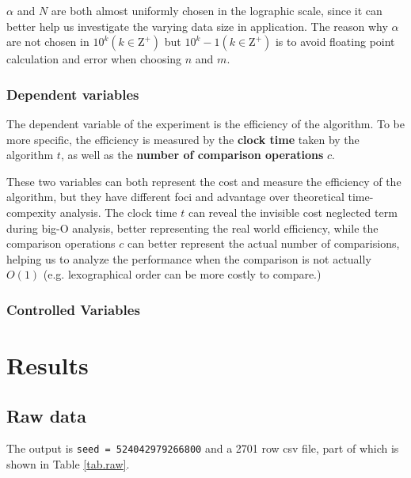 \documentclass[12pt]{article}
\begin{document}
$\alpha$ and $N$ are both almost uniformly chosen in the lographic scale, since it can better help us investigate the varying data size in application. The reason why $\alpha$ are not chosen in $10^k (k\in\mathrm{Z}^+)$ but $10^k-1 (k\in\mathrm{Z}^+)$ is to avoid floating point calculation and error when choosing $n$ and $m$.

\subsubsection{Dependent variables}

The dependent variable of the experiment is the efficiency of the algorithm. To be more specific, the efficiency is measured by the \textbf{clock time} taken by the algorithm $t$, as well as the \textbf{number of comparison operations} $c$.

These two variables can both represent the cost and measure the efficiency of the algorithm, but they have different foci and advantage over theoretical time-compexity analysis. The clock time $t$ can reveal the invisible cost neglected term during big-O analysis, better representing the real world efficiency, while the comparison operations $c$ can better represent the actual number of comparisions, helping us to analyze the performance when the comparison is not actually $O(1)$ (e.g. lexographical order can be more costly to compare.)

\subsubsection{Controlled Variables}

\section{Results}

\subsection{Raw data}

The output is \texttt{seed = 524042979266800} and a 2701 row csv file, part of which is shown in Table \ref{tab.raw}.
\end{document}
